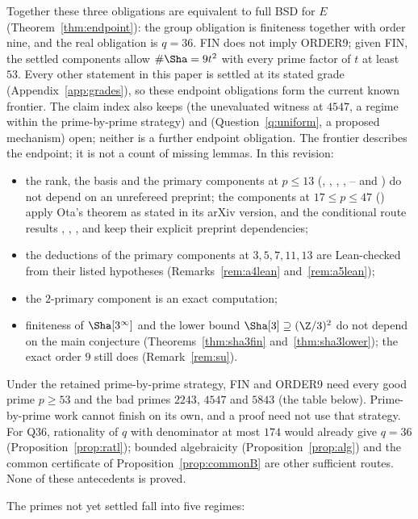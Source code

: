 Together these three obligations are equivalent to full BSD for $E$ (Theorem~\ref{thm:endpoint}): the group obligation is finiteness together with order nine, and the real obligation is $q=36$. FIN does not imply ORDER9; given FIN, the settled components allow $\#\Sha=9t^2$ with every prime factor of $t$ at least $53$. Every other statement in this paper is settled at its stated grade (Appendix~\ref{app:grades}), so these endpoint obligations form the current known frontier. The claim index also keeps  (the unevaluated witness at $4547$, a regime within the prime-by-prime strategy) and  (Question~\ref{q:uniform}, a proposed mechanism) open; neither is a further endpoint obligation. The frontier describes the endpoint; it is not a count of missing lemmas. In this revision:
\begin{itemize}[leftmargin=*]
\item the rank, the basis and the primary components at $p\le13$ (, , , , -- and ) do not depend on an unrefereed preprint; the components at $17\le p\le47$ () apply Ota's theorem as stated in its arXiv version, and the conditional route results , , ,  and  keep their explicit preprint dependencies;
\item the deductions of the primary components at $3,5,7,11,13$ are Lean-checked from their listed hypotheses (Remarks~\ref{rem:a4lean} and~\ref{rem:a5lean});
\item the $2$-primary component is an exact computation;
\item finiteness of $\Sha[3^\infty]$ and the lower bound $\Sha[3]\supseteq(\Z/3)^2$ do not depend on the main conjecture (Theorems~\ref{thm:sha3fin} and~\ref{thm:sha3lower}); the exact order $9$ still does (Remark~\ref{rem:su}).
\end{itemize}
Under the retained prime-by-prime strategy, FIN and ORDER9 need every good prime $p\ge53$ and the bad primes $2243$, $4547$ and $5843$ (the table below). Prime-by-prime work cannot finish on its own, and a proof need not use that strategy. For Q36, rationality of $q$ with denominator at most $174$ would already give $q=36$ (Proposition~\ref{prop:ratl}); bounded algebraicity (Proposition~\ref{prop:alg}) and the common certificate of Proposition~\ref{prop:commonB} are other sufficient routes. None of these antecedents is proved.

The primes not yet settled fall into five regimes:

